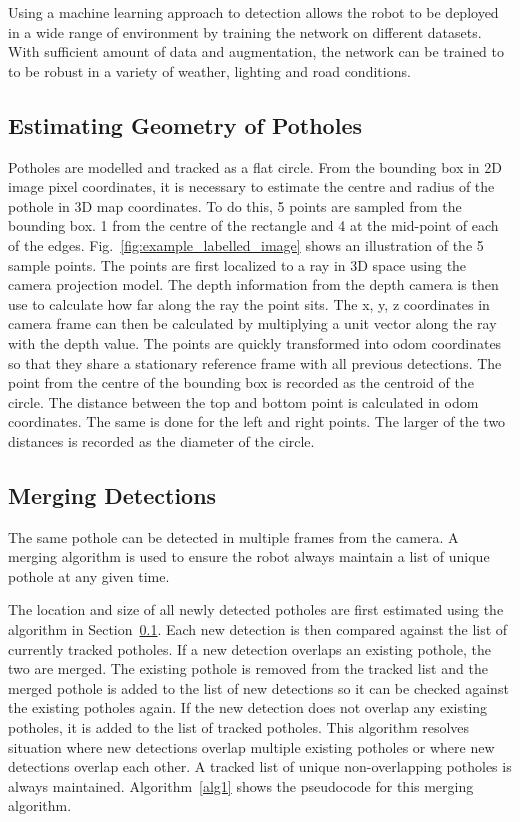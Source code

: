 \documentclass[conference]{IEEEtran}
\begin{document}
Using a machine learning approach to detection allows the robot to be deployed in a wide range of environment by training the network on different datasets. With sufficient amount of data and augmentation, the network can be trained to to be robust in a variety of weather, lighting and road conditions.

\subsection{Estimating Geometry of Potholes}\label{sec:estimate_geometry}

Potholes are modelled and tracked as a flat circle. From the bounding box in 2D image pixel coordinates, it is necessary to estimate the centre and radius of the pothole in 3D map coordinates.
To do this, 5 points are sampled from the bounding box. 1 from the centre of the rectangle and 4 at the mid-point of each of the edges. Fig.~\ref{fig:example_labelled_image} shows an illustration of the 5 sample points. The points are first localized to a ray in 3D space using the camera projection model. The depth information from the depth camera is then use to calculate how far along the ray the point sits. The x, y, z coordinates in camera frame can then be calculated by multiplying a unit vector along the ray with the depth value. The points are quickly transformed into odom coordinates so that they share a stationary reference frame with all previous detections. The point from the centre of the bounding box is recorded as the centroid of the circle. The distance between the top and bottom point is calculated in odom coordinates. The same is done for the left and right points. The larger of the two distances is recorded as the diameter of the circle.

\subsection{Merging Detections}

The same pothole can be detected in multiple frames from the camera. A merging algorithm is used to ensure the robot always maintain a list of unique pothole at any given time.

The location and size of all newly detected potholes are first estimated using the algorithm in Section~\ref{sec:estimate_geometry}. Each new detection is then compared against the list of currently tracked potholes. If a new detection overlaps an existing pothole, the two are merged. The existing pothole is removed from the tracked list and the merged pothole is added to the list of new detections so it can be checked against the existing potholes again. If the new detection does not overlap any existing potholes, it is added to the list of tracked potholes. This algorithm resolves situation where new detections overlap multiple existing potholes or where new detections overlap each other. A tracked list of unique non-overlapping potholes is always maintained. Algorithm~\ref{alg1} shows the pseudocode for this merging algorithm.
\end{document}
